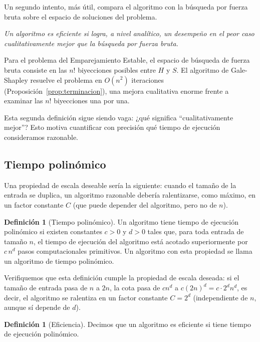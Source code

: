 \documentclass[12pt, spanish, oneside, openany]{book}
\theoremstyle{uprightplain}
\theoremstyle{definition}
\newtheorem{definicion}[teorema]{Definición}
\theoremstyle{remark}
\theoremstyle{definition}
\begin{document}
Un segundo intento, más útil, compara el algoritmo con la búsqueda por fuerza bruta sobre el espacio de soluciones del problema.

\begin{center}
\emph{Un algoritmo es eficiente si logra, a nivel analítico, un desempeño en el peor caso cualitativamente mejor que la búsqueda por fuerza bruta.}
\end{center}

Para el problema del Emparejamiento Estable, el espacio de búsqueda de fuerza bruta consiste en las $n!$ biyecciones posibles entre $H$ y $S$. El algoritmo de Gale-Shapley resuelve el problema en $O(n^2)$ iteraciones (Proposición~\ref{prop:terminacion}), una mejora cualitativa enorme frente a examinar las $n!$ biyecciones una por una.

Esta segunda definición sigue siendo vaga: ¿qué significa ``cualitativamente mejor''? Esto motiva cuantificar con precisión qué tiempo de ejecución consideramos razonable.

\subsection{Tiempo polinómico}

Una propiedad de escala deseable sería la siguiente: cuando el tamaño de la entrada se duplica, un algoritmo razonable debería ralentizarse, como máximo, en un factor constante $C$ (que puede depender del algoritmo, pero no de $n$).

\begin{definicion}[Tiempo polinómico]
\label{def:tiempo-polinomico}
Un algoritmo tiene tiempo de ejecución polinómico si existen constantes $c>0$ y $d>0$ tales que, para toda entrada de tamaño $n$, el tiempo de ejecución del algoritmo está acotado superiormente por $c\,n^d$ pasos computacionales primitivos. Un algoritmo con esta propiedad se llama un algoritmo de tiempo polinómico.
\end{definicion}

Verifiquemos que esta definición cumple la propiedad de escala deseada: si el tamaño de entrada pasa de $n$ a $2n$, la cota pasa de $cn^d$ a $c(2n)^d=c\cdot 2^d n^d$, es decir, el algoritmo se ralentiza en un factor constante $C=2^d$ (independiente de $n$, aunque sí depende de $d$).

\begin{definicion}[Eficiencia]
\label{def:eficiencia}
Decimos que un algoritmo es eficiente si tiene tiempo de ejecución polinómico.
\end{definicion}
\end{document}

